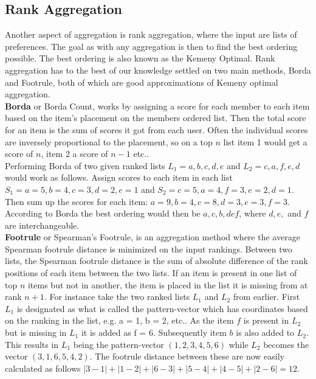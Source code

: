 \subsection{Rank Aggregation}
Another aspect of aggregation is rank aggregation, where the input are lists of preferences. The goal as with any aggregation is then to find the best ordering possible. The best ordering is also known as the Kemeny Optimal\cite{DBLP:conf/www/DworkKNS01}.
Rank aggregation has to the best of our knowledge settled on two main methods, Borda and Footrule, both of which are good approximations of Kemeny optimal aggregation.\\

\textbf{Borda} or Borda Count\cite{baltrunas}\cite{borda}, works by assigning a score for each member to each item based on the item's placement on the members ordered list. Then the total score for an item is the sum of scores it got from each user. Often the individual scores are inversely proportional to the placement, so on a top $n$ list item 1 would get a score of $n$, item 2 a score of $n-1$ etc..\\

Performing Borda of two given ranked lists $L_{1} = {a,b,c,d,e}$ and $L_{2} = {c,a,f,e,d}$ would work as follows. Assign scores to each item in each list $S_{1} = {a = 5, b = 4, c = 3, d = 2, e = 1}$ and $S_{2} = {c = 5, a = 4, f = 3, e = 2, d = 1}$. Then sum up the scores for each item: $a = 9, b = 4, c = 8, d = 3, e = 3, f = 3$. According to Borda the best ordering would then be ${a, c, b, def}$, where $d, e,$ and $f$ are interchangeable.\\

\textbf{Footrule} or Spearman’s Footrule\cite{baltrunas}, is an aggregation method where the average Spearman footrule distance is minimized on the input rankings.
Between two lists, the Spearman footrule distance is the sum of absolute difference of the rank positions of each item between the two lists. If an item is present in one list of top $n$ items but not in another, the item is placed in the list it is missing from at rank $n + 1$.
For instance take the two ranked lists $L_{1}$ and $L_{2}$ from earlier. First $L_{1}$ is designated as what is called the pattern-vector which has coordinates based on the ranking in the list, e.g. a = 1, b = 2, etc.. As the item $f$ is present in $L_{2}$ but is missing in $L_{1}$ it is added as f = 6. Subsequently item $b$ is also added to $L_{2}$. This results in $L_{1}$ being the pattern-vector $(1,2,3,4,5,6)$ while $L_{2}$ becomes the vector $(3,1,6,5,4,2)$. The footrule distance between these are now easily calculated as follows $|3-1| + |1-2| + |6-3| + |5-4| + |4-5| + |2-6| = 12$.


